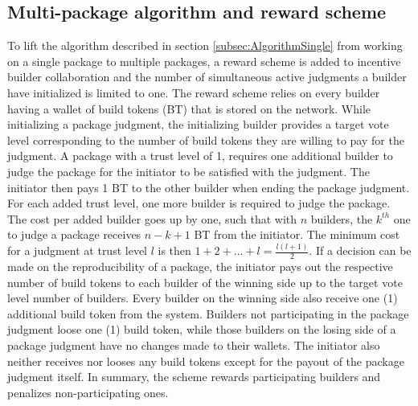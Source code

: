 \subsection{Multi-package algorithm and reward scheme}
\label{subsec:AlgorithmMulti}

To lift the algorithm described in section \ref{subsec:AlgorithmSingle} from working on a single package to multiple packages, a reward scheme is added to incentive builder collaboration and the number of simultaneous active judgments a builder have initialized is limited to one. The reward scheme relies on every builder having a wallet of build tokens (BT) that is stored on the network. While initializing a package judgment, the initializing builder provides a target vote level corresponding to the number of build tokens they are willing to pay for the judgment. A package with a trust level of 1, requires one additional builder to judge the package for the initiator to be satisfied with the judgment. The initiator then pays 1 BT to the other builder when ending the package judgment. For each added trust level, one more builder is required to judge the package. The cost per added builder goes up by one, such that with $n$ builders, the $k^{th}$ one to judge a package receives $n - k + 1$ BT from the initiator. The minimum cost for a judgment at trust level $l$ is then $1 + 2 + \dotsc + l = \frac{l(l+1)}{2}$. If a decision can be made on the reproducibility of a package, the initiator pays out the respective number of build tokens to each builder of the winning side up to the target vote level number of builders. Every builder on the winning side also receive one (1) additional build token from the system. Builders not participating in the package judgment loose one (1) build token, while those builders on the losing side of a package judgment have no changes made to their wallets. The initiator also neither receives nor looses any build tokens except for the payout of the package judgment itself. In summary, the scheme rewards participating builders and penalizes non-participating ones.
